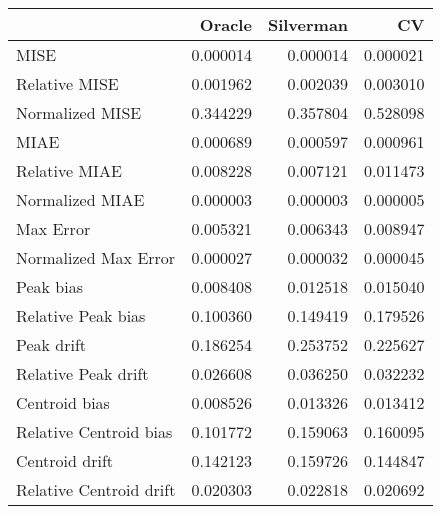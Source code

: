 \begin{tabular}{lrrr}
  \hline
 & Oracle & Silverman & CV \\ 
  \hline
MISE & 0.000014 & 0.000014 & 0.000021 \\ 
  Relative MISE & 0.001962 & 0.002039 & 0.003010 \\ 
  Normalized MISE & 0.344229 & 0.357804 & 0.528098 \\ 
  MIAE & 0.000689 & 0.000597 & 0.000961 \\ 
  Relative MIAE & 0.008228 & 0.007121 & 0.011473 \\ 
  Normalized MIAE & 0.000003 & 0.000003 & 0.000005 \\ 
  Max Error & 0.005321 & 0.006343 & 0.008947 \\ 
  Normalized Max Error & 0.000027 & 0.000032 & 0.000045 \\ 
  Peak bias & 0.008408 & 0.012518 & 0.015040 \\ 
  Relative Peak bias & 0.100360 & 0.149419 & 0.179526 \\ 
  Peak drift & 0.186254 & 0.253752 & 0.225627 \\ 
  Relative Peak drift & 0.026608 & 0.036250 & 0.032232 \\ 
  Centroid bias & 0.008526 & 0.013326 & 0.013412 \\ 
  Relative Centroid bias & 0.101772 & 0.159063 & 0.160095 \\ 
  Centroid drift & 0.142123 & 0.159726 & 0.144847 \\ 
  Relative Centroid drift & 0.020303 & 0.022818 & 0.020692 \\ 
   \hline
\end{tabular}
